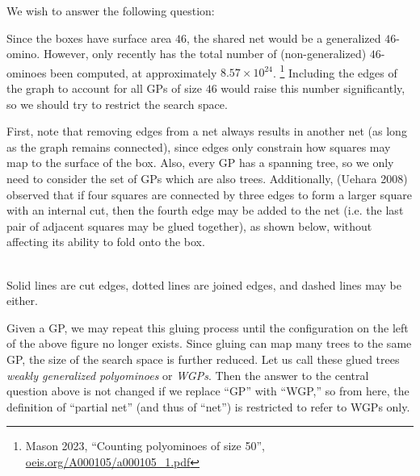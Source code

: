 \documentclass{article}
\begin{document}
We wish to answer the following question:

\begin{center}
\end{center}

Since the boxes have surface area $46$,
the shared net would be a generalized $46$-omino.
However, only recently
has the total number of (non-generalized) $46$-ominoes been computed,
at approximately $8.57 \times 10^{24}$.
\footnote{
Mason 2023, ``Counting polyominoes of size 50'',
\href{https://oeis.org/A000105/a000105\_1.pdf}{oeis.org/A000105/a000105\_1.pdf}
}
Including the edges of the graph to account for all GPs of size $46$
would raise this number significantly,
so we should try to restrict the search space.

First, note that removing edges from a net always results in another net
(as long as the graph remains connected),
since edges only constrain how squares may map to the surface of the box.
Also, every GP has a spanning tree,
so we only need to consider the set of GPs which are also trees.
Additionally, (Uehara 2008) observed that
if four squares are connected by three edges
to form a larger square with an internal cut,
then the fourth edge may be added to the net
(i.e. the last pair of adjacent squares may be glued together),
as shown below,
without affecting its ability to fold onto the box.

\begin{center}
   \\
  Solid lines are cut edges,
  dotted lines are joined edges,
  and dashed lines may be either.  
\end{center}

Given a GP, we may repeat this gluing process
until the configuration on the left of the above figure no longer exists.
Since gluing can map many trees to the same GP,
the size of the search space is further reduced.
Let us call these glued trees
\textit{weakly generalized polyominoes} or \textit{WGPs}.
Then the answer to the central question above
is not changed if we replace ``GP'' with ``WGP,''
so from here, the definition of ``partial net'' (and thus of ``net'')
is restricted to refer to WGPs only.
\end{document}
